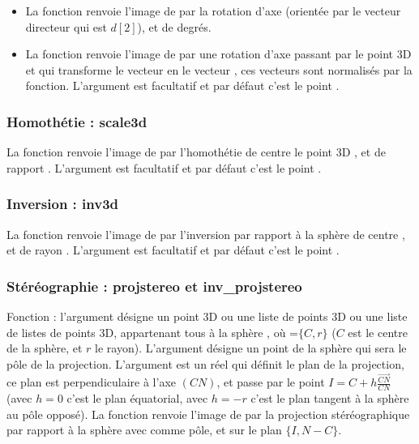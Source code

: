 \begin{itemize}
    \item La fonction  renvoie l'image de  par la rotation d'axe  (orientée par le vecteur directeur qui est $d[2]$), et de  degrés.
    
    \item La fonction  renvoie l'image de  par une rotation d'axe passant par le point 3D  et qui transforme le vecteur  en le vecteur , ces vecteurs sont normalisés par la fonction. L'argument  est facultatif et par défaut c'est le point .
\end{itemize}


\subsubsection{Homothétie : scale3d}

La fonction  renvoie l'image de  par l'homothétie de centre le point 3D , et de rapport . L'argument  est facultatif et par défaut c'est le point .

\subsubsection{Inversion : inv3d}

La fonction  renvoie l'image de  par l'inversion par rapport à la sphère de centre , et de rayon .  L'argument  est facultatif et par défaut c'est le point .

\subsubsection{Stéréographie : projstereo et inv\_projstereo}

Fonction : l'argument  désigne un point 3D ou une liste de points 3D ou une liste de listes de points 3D, appartenant tous à la sphère , où =$\{C,r\}$ ($C$ est le centre de la sphère, et $r$ le rayon). L'argument  désigne un point de la sphère qui sera le pôle de la projection. L'argument  est un réel qui définit le plan de la projection, ce plan est perpendiculaire à l'axe $(CN)$, et passe par le point $I=C+h \frac{\vec{CN}}{CN}$ (avec $h=0$ c'est le plan équatorial, avec $h=-r$ c'est le plan tangent à la sphère au pôle opposé). La fonction renvoie l'image de  par la projection stéréographique par rapport à la sphère  avec  comme pôle, et sur le plan $\{I,N-C\}$.

